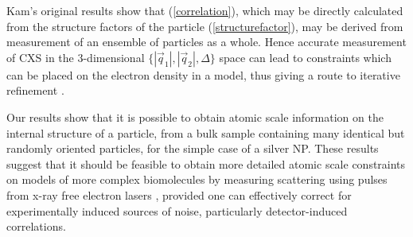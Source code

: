 \documentclass [11pt,fleqn]{article}
\begin{document}
Kam's original results \cite{Kam:1977wc} show that (\ref{correlation}), which may be directly calculated from the structure factors of the particle (\ref{structurefactor}), may be derived from measurement of an ensemble of particles as a whole. Hence accurate measurement of CXS in the 3-dimensional $\{|\vec{q}_1|,|\vec{q}_2|,\Delta\}$ space can lead to constraints which can be placed on the electron density in a model, thus giving a route to iterative refinement \cite{Schroder:2010cm}. 

Our results show that it is possible to obtain atomic scale information on the internal structure of a particle, from a bulk sample containing many identical  but randomly oriented particles, for the simple case of a silver NP. These results suggest that it should be feasible to obtain more detailed atomic scale constraints on models of more complex biomolecules by measuring scattering using pulses from x-ray free electron lasers \cite{Neutze:2000ih, Spence:2012eo}, provided one can effectively correct for experimentally induced sources of noise, particularly detector-induced correlations.
\end{document}
